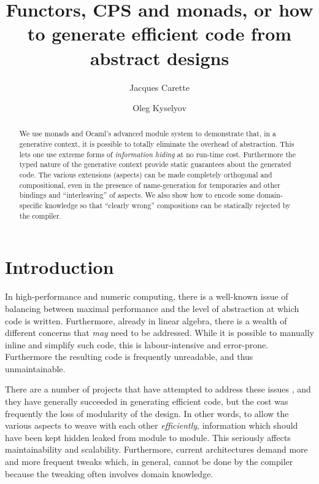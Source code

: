 \documentclass{llncs}
\begin{document}
\title{Functors, CPS and monads, or how to generate efficient
code from abstract designs}
\author{Jacques Carette
 \and
Oleg Kyselyov
}

\maketitle

\begin{abstract}
We use monads and Ocaml's advanced module system to
demonstrate that, in a generative context, it is
possible to totally eliminate the overhead of abstraction.
This lets one use extreme forms of \textit{information hiding}
at no run-time cost.  Furthermore the typed nature of
the generative context provide static guarantees about the
generated code.  The various extensions
(aspects) can be made completely orthogonal and compositional,
even in the presence of name-generation for temporaries and
other bindings and ``interleaving'' of aspects.  We also
show how to encode some domain-specific knowledge so that
``clearly wrong'' compositions can be statically rejected by the
compiler.
\end{abstract}

\section{Introduction}

In high-performance and numeric computing, there is a well-known
issue of balancing between maximal performance and the level of
abstraction at which code is written.  Furthermore, already in
linear algebra, there is a wealth of different concerns that 
\emph{may} need to be addressed.  While it is possible to manually
inline and simplify such code, this is labour-intensive and 
error-prone.  Furthermore the resulting code is frequently unreadable,
and thus unmaintainable.

There are a number of projects that have attempted to address these issues
\cite{Czarnecki,Veldhuizen:1998:ISCOPE,musser94algorithmoriented,BOOST,POOMA,ATLAS}, 
and they have generally succeeded in generating
efficient code, but the cost was frequently the loss of modularity
of the design.  In other words, to allow the various aspects to
weave with each other \emph{efficiently}, information which should
have been kept hidden leaked from module to module.  This seriously
affects maintainability and scalability.  Furthermore, current architectures
demand more and more frequent tweaks which, in general, cannot be done by the
compiler because the tweaking often involves domain knowledge.  
\end{document}
